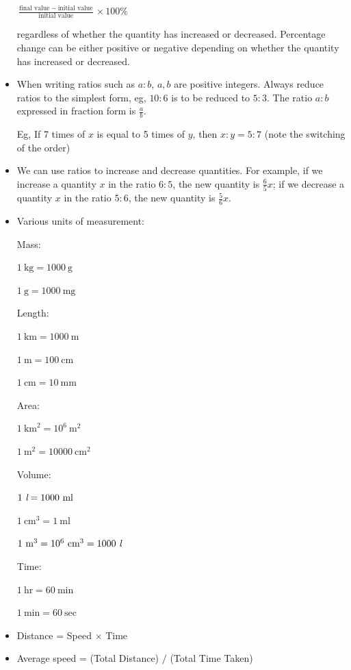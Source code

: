 \documentclass[twocolumn]{article}
\begin{document}
\begin{itemize}
$\frac{\text{final value} \ - \ \text{initial value}}{\text{initial value}} \times 100\%$

regardless of whether the quantity has increased or decreased. Percentage change can be either positive or negative depending on whether the quantity has increased or decreased.

\item When writing ratios such as $a:b$, $a,b$ are positive integers. Always reduce ratios to the simplest form, eg, $10:6$ is to be reduced to $5:3$. The ratio $a:b$ expressed in fraction form is $\frac{a}{b}$.

Eg, If 7 times of $x$ is equal to 5 times of $y$, then $x:y = 5:7$ (note the switching of the order)

\item We can use ratios to increase and decrease quantities.
For example, if we increase a quantity $x$ in the ratio $6: 5$, the new quantity is $\frac{6}{5} x$; if we decrease a quantity $x$ in the ratio $5: 6$, the new quantity is $\frac{5}{6} x$.

\item Various units of measurement:

Mass:

$1 \ \text{kg} = 1000 \ \text{g}$ 

$1 \ \text{g} = 1000 \ \text{mg}$

Length:

$1 \ \text{km} = 1000 \ \text{m}$

$1 \ \text{m} = 100 \ \text{cm}$

$1 \ \text{cm} = 10 \ \text{mm}$

Area:

$1 \ \text{km}^2 = 10^6 \ \text{m}^2$

$1 \ \text{m}^2 = 10000 \ \text{cm}^2$

Volume:

$1 \ \text{\it l} = 1000 \ \text{ml}$ 

$1 \ \text{cm}^3 = 1 \ \text{ml}$ 

$1 \ \text{m}^3 = 10^6 \ \text{cm}^3 = 1000 \ \text{\it l}$ 

Time:

$1 \ \text{hr} = 60 \ \text{min}$ 

$1 \ \text{min} = 60 \ \text{sec}$ 

\item Distance = Speed $\times$ Time

\item Average speed = (Total Distance) $/$ (Total Time Taken)


\end{itemize}
\end{document}

